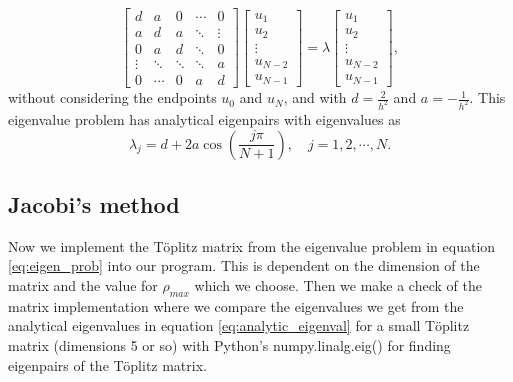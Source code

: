 \documentclass[12pt,a4paper,english]{article}
\begin{document}
\begin{equation}
\label{eq:eigen_prob}
\begin{bmatrix}
d & a & 0 & \cdots & 0\\
a & d & a &\ddots & \vdots\\
0 & a & d & \ddots & 0\\
\vdots & \ddots & \ddots & \ddots & a\\
0 & \cdots & 0 & a & d
\end{bmatrix}
\begin{bmatrix}
u_1\\
u_2\\
\vdots\\
u_{N-2}\\
u_{N-1}
\end{bmatrix} = \lambda
\begin{bmatrix}
u_1\\
u_2\\
\vdots\\
u_{N-2}\\
u_{N-1}
\end{bmatrix},
\end{equation}
without considering the endpoints $u_0$ and $u_N$, and with $d=\frac{2}{h^2}$ and $a=-\frac{1}{h^2}$. This eigenvalue problem has analytical eigenpairs with eigenvalues as
\begin{equation}
\label{eq:analytic_eigenval}
\lambda_j = d+2a\cos(\frac{j\pi}{N+1}),\quad j=1,2,\cdots,N.
\end{equation}

\subsection{Jacobi's method}
\label{sect:Jacobi}
Now we implement the Töplitz matrix from the eigenvalue problem in equation \ref{eq:eigen_prob} into our program. This is dependent on the dimension of the matrix and the value for $\rho_{max}$ which we choose. Then we make a check of the matrix implementation where we compare the eigenvalues we get from the analytical eigenvalues in equation \ref{eq:analytic_eigenval} for a small Töplitz matrix (dimensions 5 or so) with Python's numpy.linalg.eig() for finding eigenpairs of the Töplitz matrix.
\end{document}
